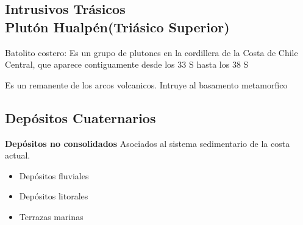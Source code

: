 \documentclass{article}
\theoremstyle{mytheoremstyle}
\theoremstyle{mytheoremstyle}
\theoremstyle{myproblemstyle}
\begin{document}
    \subsection*{Intrusivos Trásicos\\Plutón Hualpén(Triásico Superior)}
    Batolito costero: Es un grupo de plutones en la cordillera de la Costa de Chile Central, que aparece contiguamente desde los 33 S hasta los 38 S
    \par Es un remanente de los arcos volcanicos. Intruye al basamento metamorfico
    \subsection*{Depósitos Cuaternarios}
    \textbf{Depósitos no consolidados}
    Asociados al sistema sedimentario de la costa actual.
    \begin{itemize}
        \item Depósitos fluviales
        \item Depósitos litorales
        \item Terrazas marinas
    \end{itemize}
\end{document}
